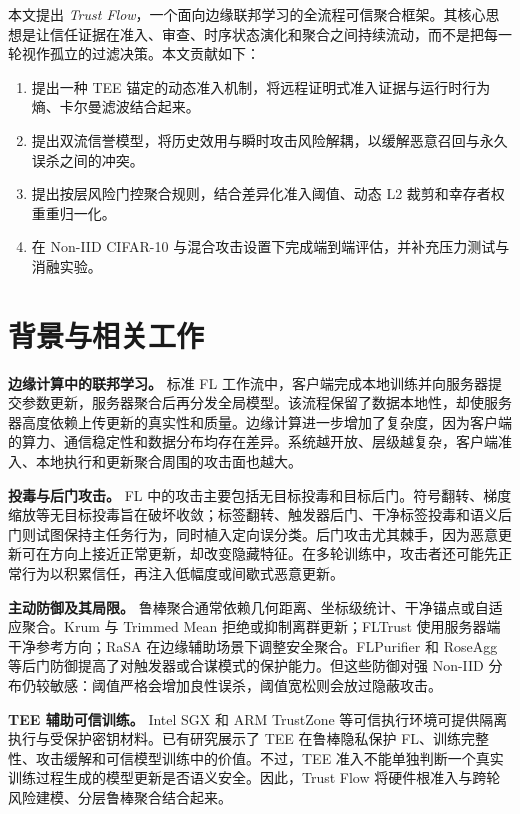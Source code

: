 \documentclass[10pt,a4paper,UTF8,fontset=fandol]{ctexart}
\newenvironment{tightenumerate}{%
  \begin{enumerate}\setlength{\itemsep}{1pt}\setlength{\parskip}{0pt}\setlength{\parsep}{0pt}}{\end{enumerate}}
\begin{document}
本文提出 \emph{Trust Flow}，一个面向边缘联邦学习的全流程可信聚合框架。其核心思想是让信任证据在准入、审查、时序状态演化和聚合之间持续流动，而不是把每一轮视作孤立的过滤决策。本文贡献如下：
\begin{tightenumerate}
    \item 提出一种 TEE 锚定的动态准入机制，将远程证明式准入证据与运行时行为熵、卡尔曼滤波结合起来。
    \item 提出双流信誉模型，将历史效用与瞬时攻击风险解耦，以缓解恶意召回与永久误杀之间的冲突。
    \item 提出按层风险门控聚合规则，结合差异化准入阈值、动态 L2 裁剪和幸存者权重重归一化。
    \item 在 Non-IID CIFAR-10 与混合攻击设置下完成端到端评估，并补充压力测试与消融实验。
\end{tightenumerate}

\section{背景与相关工作}

\textbf{边缘计算中的联邦学习。} 标准 FL 工作流中，客户端完成本地训练并向服务器提交参数更新，服务器聚合后再分发全局模型。该流程保留了数据本地性，却使服务器高度依赖上传更新的真实性和质量。边缘计算进一步增加了复杂度，因为客户端的算力、通信稳定性和数据分布均存在差异。系统越开放、层级越复杂，客户端准入、本地执行和更新聚合周围的攻击面也越大。

\textbf{投毒与后门攻击。} FL 中的攻击主要包括无目标投毒和目标后门。符号翻转、梯度缩放等无目标投毒旨在破坏收敛；标签翻转、触发器后门、干净标签投毒和语义后门则试图保持主任务行为，同时植入定向误分类。后门攻击尤其棘手，因为恶意更新可在方向上接近正常更新，却改变隐藏特征\cite{bagdasaryan2020backdoor,wang2019neuralcleanse}。在多轮训练中，攻击者还可能先正常行为以积累信任，再注入低幅度或间歇式恶意更新。

\textbf{主动防御及其局限。} 鲁棒聚合通常依赖几何距离、坐标级统计、干净锚点或自适应聚合。Krum 与 Trimmed Mean 拒绝或抑制离群更新\cite{blanchard2017krum,yin2018byzantine}；FLTrust 使用服务器端干净参考方向\cite{cao2021fltrust}；RaSA 在边缘辅助场景下调整安全聚合\cite{wang2025rasa}。FLPurifier 和 RoseAgg 等后门防御提高了对触发器或合谋模式的保护能力\cite{flpurifier,roseagg}。但这些防御对强 Non-IID 分布仍较敏感：阈值严格会增加良性误杀，阈值宽松则会放过隐蔽攻击。

\textbf{TEE 辅助可信训练。} Intel SGX 和 ARM TrustZone 等可信执行环境可提供隔离执行与受保护密钥材料。已有研究展示了 TEE 在鲁棒隐私保护 FL、训练完整性、攻击缓解和可信模型训练中的价值\cite{zhang2025rppfl,r1_tee_integrity,r5_tee_mitigating,lu2025tmt}。不过，TEE 准入不能单独判断一个真实训练过程生成的模型更新是否语义安全。因此，Trust Flow 将硬件根准入与跨轮风险建模、分层鲁棒聚合结合起来。
\end{document}
